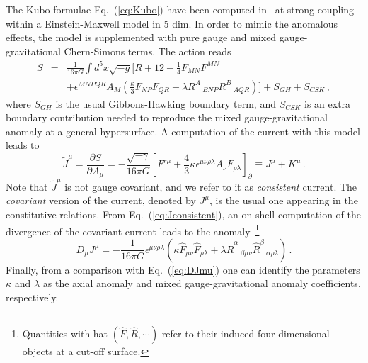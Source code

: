 \documentclass[a4paper]{jpconf}
\begin{document}
The Kubo formulae Eq.~(\ref{eq:Kubo}) have been computed in~\cite{Landsteiner:2011iq,Megias:2013joa,Landsteiner:2011tf} at strong coupling within a Einstein-Maxwell model in 5 dim. In order to mimic the anomalous effects, the model is supplemented with pure gauge and mixed gauge-gravitational Chern-Simons terms. The action reads
\begin{eqnarray}
 S &=& \frac{1}{16\pi G} \int d^5x \sqrt{-g} \Bigg[ R + 12 - \frac 1 4 F_{MN} F^{MN} \nonumber \\ 
&&+ \epsilon^{MNPQR} A_M \left( \frac\kappa 3 F_{NP} F_{QR} + \lambda R^A\,_{BNP} R^B\,_{AQR}   \right) \Bigg] + S_{GH} + S_{CSK} \,, \label{eq:model1}
\end{eqnarray}
where $S_{GH}$ is the usual Gibbons-Hawking boundary term, and $S_{CSK}$ is an extra boundary contribution needed to reproduce the mixed gauge-gravitational anomaly at a general hypersurface. A computation of the current with this model leads to
\begin{equation}
\tilde{J}^\mu = \frac{\partial S}{\partial A_\mu} = -\frac{\sqrt{-\gamma}}{16\pi G} \left[ F^{r\mu} + \frac{4}{3}\kappa \epsilon^{\mu\nu\rho\lambda} A_\nu F_{\rho\lambda}\right]_\partial \equiv J^\mu + K^\mu \,. \label{eq:Jconsistent}
\end{equation}
Note that $\tilde{J}^\mu$ is not gauge covariant, and we refer to it as {\it consistent} current. The {\it covariant} version of the current, denoted by $J^\mu$, is the usual one appearing in the constitutive relations. From Eq.~(\ref{eq:Jconsistent}), an on-shell computation of the divergence of the covariant current leads to the anomaly~\footnote{Quantities with hat $({\hat F}, {\hat R}, \cdots)$ refer to their induced four dimensional objects at a cut-off surface.}
\begin{equation}
D_\mu J^\mu = -\frac{1}{16\pi G} \epsilon^{\mu\nu\rho\lambda} \left(
\kappa {\hat F}_{\mu\nu} {\hat F}_{\rho\lambda} + \lambda {\hat R}^\alpha\,_{\beta\mu\nu} {\hat R}^\beta\,_{\alpha\rho\lambda} \right) \,.
\end{equation}
Finally, from a comparison with Eq.~(\ref{eq:DJmu}) one can identify the parameters $\kappa$ and $\lambda$ as the axial anomaly and mixed gauge-gravitational anomaly coefficients, respectively.
\end{document}
